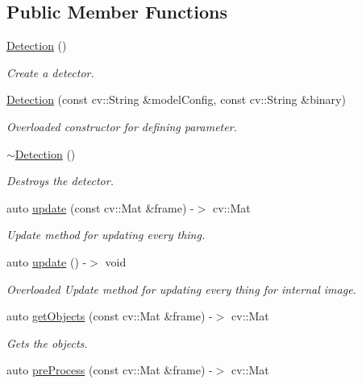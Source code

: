 \subsection*{Public Member Functions}
\begin{DoxyCompactItemize}
\item 
\hyperlink{class_detection_a86e6ebf5a660a29e78ee7a7f08292260}{Detection} ()
\begin{DoxyCompactList}\small\item\em Create a detector. \end{DoxyCompactList}\item 
\hyperlink{class_detection_a27315b70fad96e80db6a5b9f52fe7071}{Detection} (const cv\+::\+String \&model\+Config, const cv\+::\+String \&binary)
\begin{DoxyCompactList}\small\item\em Overloaded constructor for defining parameter. \end{DoxyCompactList}\item 
\hyperlink{class_detection_abbfdeb60a10132d820fcd20dd292e400}{$\sim$\+Detection} ()
\begin{DoxyCompactList}\small\item\em Destroys the detector. \end{DoxyCompactList}\item 
auto \hyperlink{class_detection_a7ec75616ce302825816a0ee350452ef8}{update} (const cv\+::\+Mat \&frame) -\/$>$ cv\+::\+Mat
\begin{DoxyCompactList}\small\item\em Update method for updating every thing. \end{DoxyCompactList}\item 
auto \hyperlink{class_detection_a5a959a3e87c5cfba1ae5a78429df6b5c}{update} () -\/$>$ void
\begin{DoxyCompactList}\small\item\em Overloaded Update method for updating every thing for internal image. \end{DoxyCompactList}\item 
auto \hyperlink{class_detection_aa1bbf9f6725e8f412f694ca7cf759ff5}{get\+Objects} (const cv\+::\+Mat \&frame) -\/$>$ cv\+::\+Mat
\begin{DoxyCompactList}\small\item\em Gets the objects. \end{DoxyCompactList}\item 
auto \hyperlink{class_detection_a898f16ebdea8c1c3cc2cd789a9bfadc9}{pre\+Process} (const cv\+::\+Mat \&frame) -\/$>$ cv\+::\+Mat

\end{DoxyCompactItemize}
